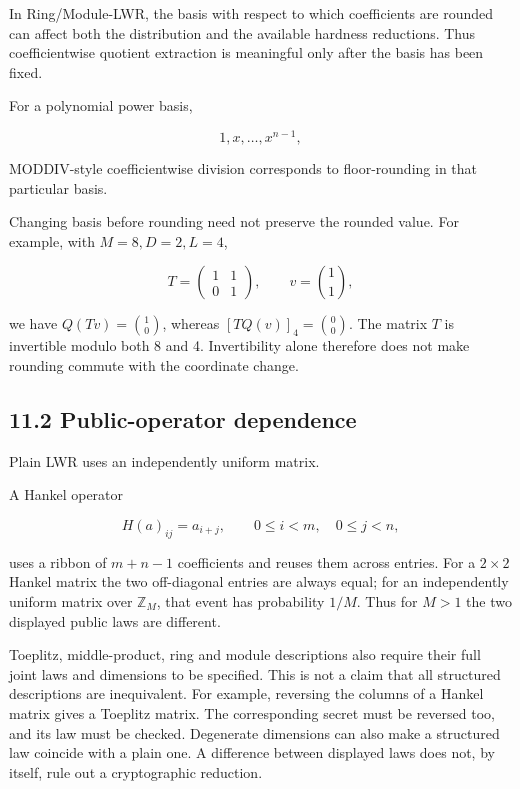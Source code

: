 \documentclass[11pt,a4paper]{article}
\begin{document}
In Ring/Module-LWR, the basis with respect to which coefficients are rounded can affect both the distribution and the available hardness reductions. Thus coefficientwise quotient extraction is meaningful only after the basis has been fixed.

For a polynomial power basis,

\[
1,x,\ldots,x^{n-1},
\]

MODDIV-style coefficientwise division corresponds to floor-rounding in that particular basis.

Changing basis before rounding need not preserve the rounded value. For example, with \(M=8,D=2,L=4\),

\[
T=\begin{pmatrix}1&1\\0&1\end{pmatrix},\qquad v=\binom{1}{1},
\]

we have \(Q(Tv)=\binom{1}{0}\), whereas \([TQ(v)]_4=\binom{0}{0}\). The matrix \(T\) is invertible modulo both 8 and 4. Invertibility alone therefore does not make rounding commute with the coordinate change.

\subsection{11.2 Public-operator dependence}\label{public-operator-dependence}

Plain LWR uses an independently uniform matrix.

A Hankel operator

\[
H(a)_{ij}=a_{i+j},\qquad0\le i<m,\quad0\le j<n,
\]

uses a ribbon of \(m+n-1\) coefficients and reuses them across entries. For a \(2\times2\) Hankel matrix the two off-diagonal entries are always equal; for an independently uniform matrix over \(\mathbb Z_M\), that event has probability \(1/M\). Thus for \(M>1\) the two displayed public laws are different.

Toeplitz, middle-product, ring and module descriptions also require their full joint laws and dimensions to be specified. This is not a claim that all structured descriptions are inequivalent. For example, reversing the columns of a Hankel matrix gives a Toeplitz matrix. The corresponding secret must be reversed too, and its law must be checked. Degenerate dimensions can also make a structured law coincide with a plain one. A difference between displayed laws does not, by itself, rule out a cryptographic reduction.
\end{document}
